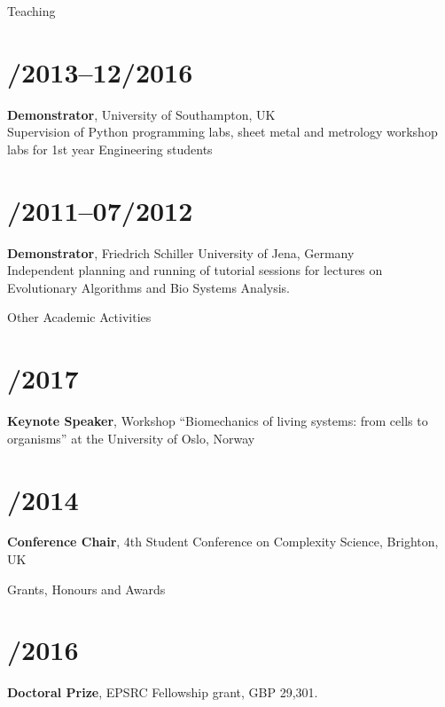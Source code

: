 \documentclass[margin,line,10pt]{res}
\begin{document}
\begin{resume}
\vspace*{-.2in}

{\sc Teaching}\\
\vspace*{-.35in}
\section{/2013--12/2016}{\bf Demonstrator}, University of Southampton, UK\\
Supervision of Python programming labs, sheet metal and metrology workshop labs for 1st year Engineering students\\
\vspace*{-.35in}
\section{/2011--07/2012}{\bf Demonstrator}, Friedrich Schiller University of Jena, Germany\\
Independent planning and running of tutorial sessions for lectures on Evolutionary Algorithms and Bio Systems Analysis.\\

\vspace*{-.2in}

{\sc Other Academic Activities}\\
\vspace*{-.35in}
\section{/2017}{\bf Keynote Speaker}, Workshop ``Biomechanics of living systems: from cells to organisms'' at the University of Oslo, Norway\\
\vspace*{-.35in}
\section{/2014}{\bf Conference Chair}, 4th Student Conference on Complexity Science, Brighton, UK\\

\vspace*{-.2in}

{\sc Grants, Honours and Awards}\\
\vspace*{-.35in}
\section{/2016}{\bf Doctoral Prize}, EPSRC Fellowship grant, GBP 29,301.\\
\vspace*{-.35in}

\end{resume}
\end{document}
